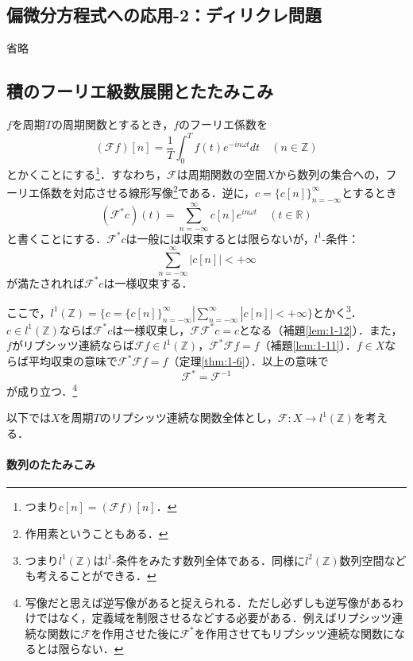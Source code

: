\documentclass[dvipdfmx,a4j,10pt]{jsarticle}
\theoremstyle{mystyle1}
\theoremstyle{mystyle3}
\theoremstyle{mystyle4}
\theoremstyle{mystyle6}
\theoremstyle{mystyle2}
\theoremstyle{mystyle5}
\begin{document}
\subsection{偏微分方程式への応用-2：ディリクレ問題}

省略

\setcounter{equation}{14}
\setcounter{theorem}{10}

\subsection{積のフーリエ級数展開とたたみこみ}

$f$を周期$T$の周期関数とするとき，$f$のフーリエ係数を
\[
	(\mathcal{F}f)[n]=\frac{1}{T}\int_0^T f(t)e^{-in\omega t}dt\quad(n\in\mathbb{Z})
\]
とかくことにする\footnote{つまり$c[n]=(\mathcal{F}f)[n]$．}．すなわち，$\mathcal{F}$は周期関数の空間$X$から数列の集合への，フーリエ係数を対応させる線形写像\footnote{作用素ということもある．}である．逆に，$c=\{c[n]\}_{n=-\infty}^\infty$とするとき
\[
	(\mathcal{F}^* c)(t)=\sum_{n=-\infty}^\infty c[n]e^{in\omega t}\quad(t\in\mathbb{R})
\]
と書くことにする．$\mathcal{F}^* c$は一般には収束するとは限らないが，$l^1$-条件：
\begin{equation}\label{eq:2-15}
	\sum_{n=-\infty}^\infty |c[n]|<+\infty
\end{equation}
が満たされれば$\mathcal{F}^* c$は一様収束する．

ここで，$l^1(\mathbb{Z})=\{c=\{c[n]\}_{n=-\infty}^{\infty} | \sum_{n=-\infty}^\infty |c[n]|<+\infty  \}$とかく\footnote{つまり$l^1(\mathbb{Z})$は$l^1$-条件をみたす数列全体である．同様に$l^2(\mathbb{Z})$数列空間なども考えることができる．}．
$c\in l^1(\mathbb{Z})$ならば$\mathcal{F}^* c$は一様収束し，$\mathcal{F}\mathcal{F}^* c=c$となる（補題\ref{lem:1-12}）．また，$f$がリプシッツ連続ならば$\mathcal{F}f\in l^1(\mathbb{Z})$，$\mathcal{F}^*\mathcal{F} f=f$（補題\ref{lem:1-11}）．$f\in X$ならば平均収束の意味で$\mathcal{F}^*\mathcal{F} f=f$（定理\ref{thm:1-6}）．以上の意味で
\[
	\mathcal{F}^*=\mathcal{F}^{-1}
\]
が成り立つ．\footnote{写像だと思えば逆写像があると捉えられる．ただし必ずしも逆写像があるわけではなく，定義域を制限させるなどする必要がある．例えばリプシッツ連続な関数に$\mathcal{F}$を作用させた後に$\mathcal{F}^*$を作用させてもリプシッツ連続な関数になるとは限らない．}

以下では$X$を周期$T$のリプシッツ連続な関数全体とし，$\mathcal{F}:X\to l^1(\mathbb{Z})$を考える．

\paragraph{数列のたたみこみ}
\end{document}
